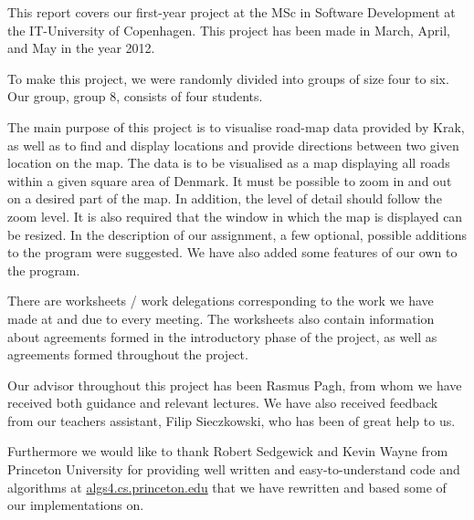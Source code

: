 This report covers our first-year project at the MSc in Software Development at the IT-University of Copenhagen. This project has been made in March, April, and May in the year 2012. 

To make this project, we were randomly divided into groups of size four to six. Our group, group 8, consists of four students. 

The main purpose of this project is to visualise road-map data provided by Krak, as well as to find and display locations and provide directions between two given location on the map. The data is to be visualised as a map displaying all roads within a given square area of Denmark.
It must be possible to zoom in and out on a desired part of the map. In addition, the level of detail should follow the zoom level. It is also required that the window in which the map is displayed can be resized. In the description of our assignment, a few optional, possible additions to the program were suggested. We have also added some features of our own to the program.

There are worksheets / work delegations corresponding to the work we have made at and due to every meeting. The worksheets also contain information about agreements formed in the introductory phase of the project, as well as agreements formed throughout the project.

Our advisor throughout this project has been Rasmus Pagh, from whom we have received both guidance and relevant lectures. We have also received feedback from our teachers assistant, Filip Sieczkowski, who has been of great help to us.

Furthermore we would like to thank Robert Sedgewick and Kevin Wayne from Princeton University for providing well written and easy-to-understand code and algorithms at \url{algs4.cs.princeton.edu} that we have rewritten and based some of our implementations on.